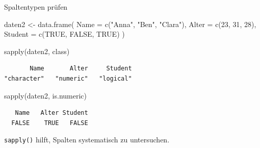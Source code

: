 \documentclass[
  10pt,
  ignorenonframetext,
  aspectratio=169,
]{beamer}
\newenvironment{Shaded}{}{}
\newcommand{\AttributeTok}[1]{\textcolor[rgb]{0.49,0.56,0.16}{#1}}
\newcommand{\ConstantTok}[1]{\textcolor[rgb]{0.53,0.00,0.00}{#1}}
\newcommand{\DecValTok}[1]{\textcolor[rgb]{0.25,0.63,0.44}{#1}}
\newcommand{\FunctionTok}[1]{\textcolor[rgb]{0.02,0.16,0.49}{#1}}
\newcommand{\NormalTok}[1]{#1}
\newcommand{\OtherTok}[1]{\textcolor[rgb]{0.00,0.44,0.13}{#1}}
\newcommand{\StringTok}[1]{\textcolor[rgb]{0.25,0.44,0.63}{#1}}
\begin{document}
\begin{frame}[fragile]{Spaltentypen prüfen}
\label{spaltentypen-pruxfcfen}
\begin{Shaded}
\begin{Highlighting}[]
\NormalTok{daten2 }\OtherTok{\textless{}{-}} \FunctionTok{data.frame}\NormalTok{(}
  \AttributeTok{Name =} \FunctionTok{c}\NormalTok{(}\StringTok{"Anna"}\NormalTok{, }\StringTok{"Ben"}\NormalTok{, }\StringTok{"Clara"}\NormalTok{),}
  \AttributeTok{Alter =} \FunctionTok{c}\NormalTok{(}\DecValTok{23}\NormalTok{, }\DecValTok{31}\NormalTok{, }\DecValTok{28}\NormalTok{),}
  \AttributeTok{Student =} \FunctionTok{c}\NormalTok{(}\ConstantTok{TRUE}\NormalTok{, }\ConstantTok{FALSE}\NormalTok{, }\ConstantTok{TRUE}\NormalTok{)}
\NormalTok{)}

\FunctionTok{sapply}\NormalTok{(daten2, class)}
\end{Highlighting}
\end{Shaded}

\begin{verbatim}
       Name       Alter     Student 
"character"   "numeric"   "logical" 
\end{verbatim}

\begin{Shaded}
\begin{Highlighting}[]
\FunctionTok{sapply}\NormalTok{(daten2, is.numeric)}
\end{Highlighting}
\end{Shaded}

\begin{verbatim}
   Name   Alter Student 
  FALSE    TRUE   FALSE 
\end{verbatim}

\texttt{sapply()} hilft, Spalten systematisch zu untersuchen.
\end{frame}
\end{document}
